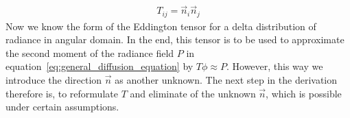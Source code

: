 \begin{align}
T_{ij} = \vec{n}_i\vec{n}_j
\label{eq:iso_delta_T}
\end{align}
Now we know the form of the Eddington tensor for a delta distribution of radiance in angular domain. In the end, this tensor is to be used to approximate the second moment of the radiance field $P$ in equation~\ref{eq:general_diffusion_equation} by $T\phi\approx P$. However, this way we introduce the direction $\vec{n}$ as another unknown. The next step in the derivation therefore is, to reformulate $T$ and eliminate of the unknown $\vec{n}$, which is possible under certain assumptions.

